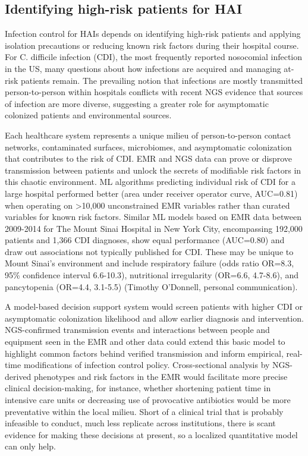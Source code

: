 \subsection{Identifying high-risk patients for HAI}

Infection control for HAIs depends on identifying high-risk patients and applying isolation precautions or reducing known risk factors during their hospital course. For C. difficile infection (CDI), the most frequently reported nosocomial infection in the US, many questions about how infections are acquired and managing at-risk patients remain.\autocite{Leffler2015} The prevailing notion that infections are mostly transmitted person-to-person within hospitals \autocite{Cohen2010} conflicts with recent NGS evidence that sources of infection are more diverse,\autocite{Eyre2013} suggesting a greater role for asymptomatic colonized patients and environmental sources.

Each healthcare system represents a unique milieu of person-to-person contact networks, contaminated surfaces, microbiomes, and asymptomatic colonization that contributes to the risk of CDI. EMR and NGS data can prove or disprove transmission between patients and unlock the secrets of modifiable risk factors in this chaotic environment. ML algorithms predicting individual risk of CDI for a large hospital performed better (area under receiver operator curve, AUC=0.81) when operating on >10,000 unconstrained EMR variables rather than curated variables for known risk factors.\autocite{Wiens2014} Similar ML models based on EMR data between 2009-2014 for The Mount Sinai Hospital in New York City, encompassing 192,000 patients and 1,366 CDI diagnoses, show equal performance (AUC=0.80) and draw out associations not typically published for CDI. These may be unique to Mount Sinai’s environment and include respiratory failure (odds ratio OR=8.3, 95\% confidence interval 6.6-10.3), nutritional irregularity (OR=6.6, 4.7-8.6), and pancytopenia (OR=4.4, 3.1-5.5) (Timothy O’Donnell, personal communication).

A model-based decision support system would screen patients with higher CDI or asymptomatic colonization likelihood and allow earlier diagnosis and intervention. NGS-confirmed transmission events and interactions between people and equipment seen in the EMR and other data could extend this basic model to highlight common factors behind verified transmission and inform empirical, real-time modifications of infection control policy. Cross-sectional analysis by NGS-derived phenotypes and risk factors in the EMR would facilitate more precise clinical decision-making, for instance, whether shortening patient time in intensive care units or decreasing use of provocative antibiotics would be more preventative within the local milieu.  Short of a clinical trial that is probably infeasible to conduct, much less replicate across institutions, there is scant evidence for making these decisions at present, so a localized quantitative model can only help.

